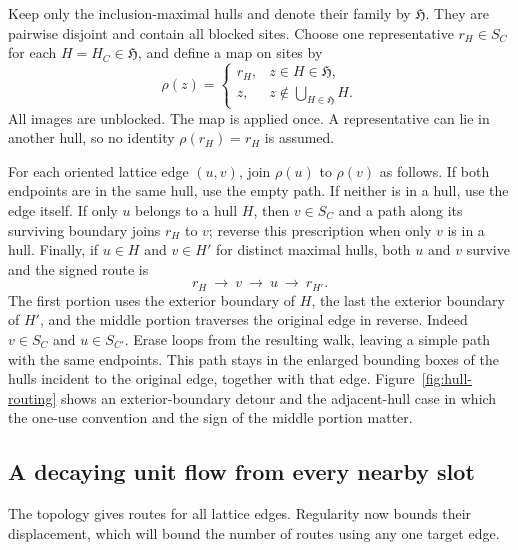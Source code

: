 Keep only the inclusion-maximal hulls and denote their family by
$\mathfrak H$.  They are pairwise disjoint and contain all blocked sites.
Choose one representative $r_H\in S_C$ for each $H=H_C\in\mathfrak H$,
and define a map on sites by
\begin{equation}\label{eq:once-only-map}
 \rho(z)=
 \begin{cases}
 r_H,&z\in H\in\mathfrak H,\\
 z,&z\notin\bigcup_{H\in\mathfrak H}H.
 \end{cases}
\end{equation}
All images are unblocked.  The map is applied once.  A representative
can lie in another hull, so no identity $\rho(r_H)=r_H$ is assumed.

For each oriented lattice edge $(u,v)$, join $\rho(u)$ to $\rho(v)$ as
follows.  If both endpoints are in the same hull, use the empty path.
If neither is in a hull, use the edge itself.  If only $u$ belongs to a
hull $H$, then $v\in S_C$ and a path along its surviving boundary joins
$r_H$ to $v$; reverse this prescription when only $v$ is in a hull.
Finally, if $u\in H$ and $v\in H'$ for distinct maximal hulls, both
$u$ and $v$ survive and the signed route is
\begin{equation}\label{eq:adjacent-hull-route}
 r_H\ \longrightarrow\ v\ \longrightarrow\ u\ \longrightarrow\ r_{H'}.
\end{equation}
The first portion uses the exterior boundary of $H$, the last the exterior
boundary of $H'$, and the middle portion traverses the original edge in
reverse.  Indeed $v\in S_C$ and $u\in S_{C'}$.  Erase loops from the
resulting walk, leaving a simple path with the same endpoints.  This path
stays in the enlarged bounding boxes of the hulls incident to the original
edge, together with that edge.  Figure~\ref{fig:hull-routing} shows an
exterior-boundary detour and the adjacent-hull case in which the one-use
convention and the sign of the middle portion matter.


\FloatBarrier

\subsection{A decaying unit flow from every nearby slot}

The topology gives routes for all lattice edges.  Regularity now bounds
their displacement, which will bound the number of routes using any one
target edge.

